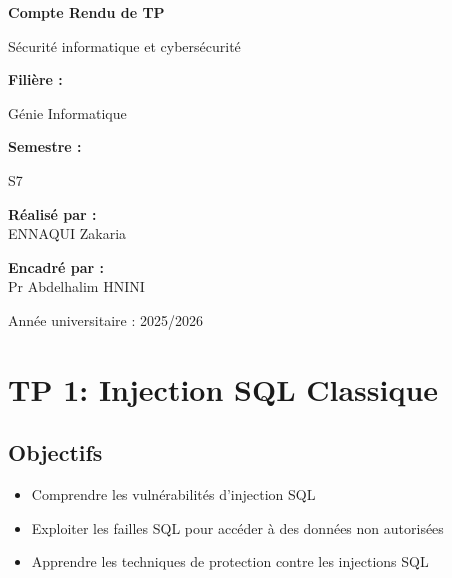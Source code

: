 \documentclass[12pt,a4paper]{article}
\begin{document}
\begin{titlepage}
    {\Huge\bfseries\color{maincolor} Compte Rendu de TP\par}
    \vspace{1cm}
    {\LARGE Sécurité informatique et cybersécurité\par}

    \vspace{2cm}

    {\large\bfseries Filière :} {\large Génie Informatique\par}
    \vspace{0.3cm}
    {\large\bfseries Semestre :} {\large S7\par}

    \vfill

    \begin{minipage}{0.45\textwidth}
        \flushleft
        {\bfseries Réalisé par :}\\
        ENNAQUI Zakaria
    \end{minipage}
    \hfill
    \begin{minipage}{0.45\textwidth}
        \flushright
        {\bfseries Encadré par :}\\
        Pr Abdelhalim HNINI
    \end{minipage}

    \vspace{1cm}

    {\large Année universitaire : 2025/2026\par}

\end{titlepage}

\tableofcontents
\newpage

\section{TP 1: Injection SQL Classique}

\subsection{Objectifs}
\begin{itemize}
    \item Comprendre les vulnérabilités d'injection SQL
    \item Exploiter les failles SQL pour accéder à des données non autorisées
    \item Apprendre les techniques de protection contre les injections SQL
\end{itemize}
\end{document}
